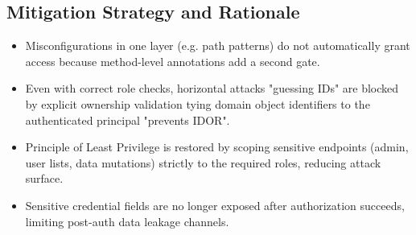 \documentclass[]{UCD_CS_FYP_Report}
\begin{document}
\subsection*{Mitigation Strategy and Rationale}
\begin{itemize}
	\item Misconfigurations in one layer (e.g. path patterns) do not automatically grant access because method-level annotations add a second gate.
	\item Even with correct role checks, horizontal attacks "guessing IDs" are blocked by explicit ownership validation tying domain object identifiers to the authenticated principal "prevents IDOR".
	\item Principle of Least Privilege is restored by scoping sensitive endpoints (admin, user lists, data mutations) strictly to the required roles, reducing attack surface.
	\item Sensitive credential fields are no longer exposed after authorization succeeds, limiting post-auth data leakage channels.
\end{itemize}
\end{document}
